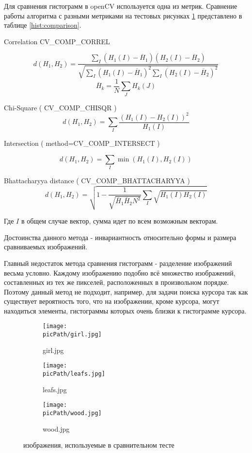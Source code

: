 \documentclass[oneside,final,14pt]{extreport}
\newcommand{\picPath}{pictures}
\begin{document}
Для сравнения гистограмм в openCV используется одна из метрик. Сравнение работы алгоритма с разными метриками на тестовых рисунках \ref{hist:pics} представлено в таблице \ref{hist:comparison}.  

Correlation  CV\_COMP\_CORREL
 
$$
d(H_1,H_2) 
= 
\frac{
\sum_I(H_1(I) - \overline{H}_1)
(H_2(I)-\overline{H}_2)
}{
	\sqrt{
		\sum_I(H_1(I) - \overline{H}_1)^2
		\sum_I(H_2(I) - \overline{H}_2)^2
	}
}
$$
$$
\overline{H}_k 
= 
\frac{1}{N}
\sum_J H_k(J)
$$

Chi-Square ( CV\_COMP\_CHISQR )
$$
d(H_1,H_2)
=
\sum_I \frac{
	(H_1(I) - H_2(I))^2}
{H_1(I)}
$$

Intersection ( method=CV\_COMP\_INTERSECT )

$$
d(H_1,H_2)
=
\sum_I 
\min (H_1(I),H_2(I))
$$

Bhattacharyya distance ( CV\_COMP\_BHATTACHARYYA )
$$
d(H_1,H_2)
=
\sqrt{ 1 - 
\frac{1}{
  \sqrt{\overline{H}_1 
  		\overline{H}_2
  		N^2}
  }
  \sum_I
  \sqrt{H_1(I) H_2(I)}
}
$$

Где $I$ в общем случае вектор, сумма идет по всем возможным векторам.


Достоинства данного метода - инвариантность относительно формы и размера сравниваемых изображений.

Главный недостаток метода сравнения гистограмм -   разделение изображений весьма условно. Каждому изображению подобно всё множество изображений, составленных из тех же пикселей, расположенных в произвольном порядке. Поэтому данный метод не подходит, например,  для задачи поиска курсора так как существует вероятность того, что на изображении, кроме курсора, могут находиться элементы, гистограммы которых очень близки к гистограмме курсора.   

\begin{figure}[H]
\begin{center}
\begin{subfigure}[b]{0.2\linewidth}
    	\texttt{[image: \\picPath/girl.jpg]}
    	\caption{ girl.jpg}
  \end{subfigure}
  \begin{subfigure}[b]{0.3\linewidth}
    	\texttt{[image: \\picPath/leafs.jpg]}
    	\caption{ leafs.jpg}
  \end{subfigure}
  \begin{subfigure}[b]{0.3\linewidth}
    	\texttt{[image: \\picPath/wood.jpg]}
    	\caption{ wood.jpg}
  \end{subfigure}
\end{center}
  \caption{изображения, используемые в сравнительном тесте  }
  \label{hist:pics}
\end{figure}
\end{document}

